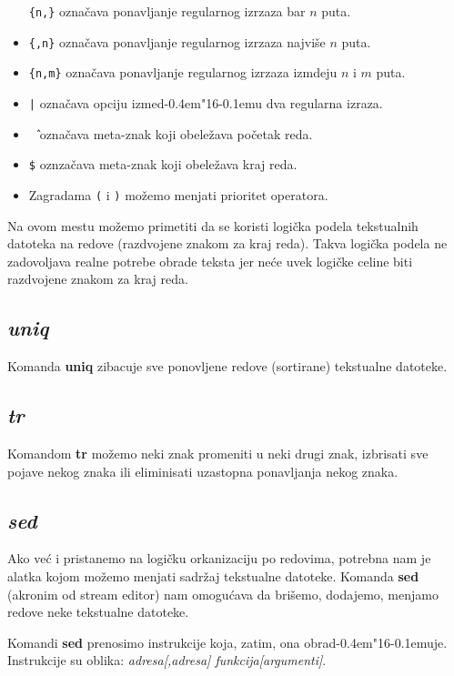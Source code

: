 \documentclass[12pt,a4paper]{article}
\def\d{d\kern-0.4em\char"16\kern-0.1em}
\begin{document}
\begin{itemize}
        {\tt\{n,\}} ozna\v cava ponavljanje regularnog izrzaza bar $n$ puta.
      \item
        {\tt\{,n\}} ozna\v cava ponavljanje regularnog izrzaza najvi\v se $n$
        puta.
      \item
        {\tt\{n,m\}} ozna\v cava ponavljanje regularnog izrzaza izmdeju $n$ i
        $m$ puta.
      \item
        {\tt|} ozna\v cava opciju izme\d u dva regularna izraza.
      \item
        {\tt\^\ } ozna\v cava meta-znak koji obele\v zava po\v cetak reda.
      \item
        {\tt\$} oznza\v cava meta-znak koji obele\v zava kraj reda.
      \item
        Zagradama {\tt(} i {\tt)} mo\v zemo menjati prioritet operatora.
      \end{itemize}

      Na ovom mestu mo\v zemo primetiti da se koristi logi\v cka podela
      tekstualnih datoteka na redove (razdvojene znakom za kraj reda).
      Takva logi\v cka podela ne zadovoljava realne potrebe obrade teksta
      jer ne\'ce uvek logi\v cke celine biti razdvojene znakom za kraj reda.
%
    \subsection{\em uniq}
      Komanda {\bf uniq} zibacuje sve ponovljene redove (sortirane) tekstualne
      da\-toteke.
%
    \subsection{\em tr}
      Komandom {\bf tr} mo\v zemo neki znak promeniti u neki drugi znak,
      izbrisati sve pojave nekog znaka ili eliminisati uzastopna ponavljanja
      nekog znaka.
%
    \subsection{\em sed}
      Ako ve\'c i pristanemo na logi\v cku orkanizaciju po redovima, potrebna
      nam je alatka kojom mo\v zemo menjati sadr\v zaj tekstualne datoteke.
      Komanda {\bf sed} (akronim od stream editor) nam omogu\'cava da
      bri\v semo, dodajemo, menjamo redove neke tekstualne datoteke.

      Komandi {\bf sed} prenosimo instrukcije koja, zatim, ona obra\d uje.
      Instrukcije su oblika: {\it adresa[,adresa] funkcija[argumenti]}.
\end{document}
